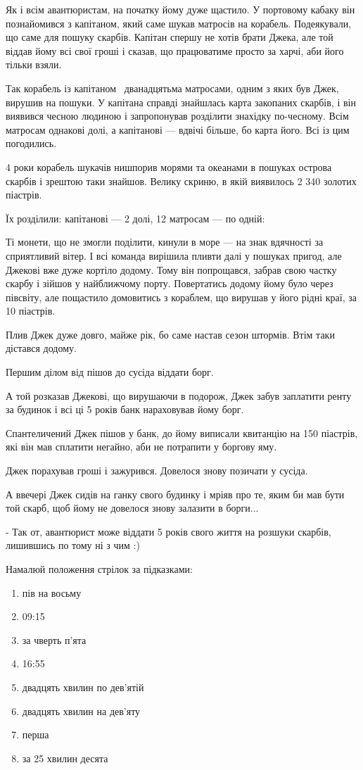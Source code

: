 Як і всім авантюристам, на початку йому дуже щастило.
У портовому кабаку він познайомився з капітаном, який саме шукав
матросів на корабель. Подеякували, що саме для пошуку скарбів.
Капітан спершу не хотів брати Джека, але той віддав йому всі свої
гроші і сказав, що працюватиме просто за харчі, аби його тільки взяли.

Так корабель із капітаном  дванадцятьма матросами, одним з яких був Джек,
вирушив на пошуки. У капітана справді знайшлась карта закопаних скарбів,
і він виявився чесною людиною і запропонував розділити знахідку по-чесному.
Всім матросам однакові долі, а капітанові --- вдвічі більше, бо карта його.
Всі із цим погодились.

4 роки корабель шукачів нишпорив морями та океанами в пошуках острова
скарбів і зрештою таки знайшов. Велику скриню, в якій виявилось
2 340 золотих піастрів.

Їх розділили: капітанові --- 2 долі, 12 матросам --- по одній:

Ті монети, що не змогли поділити, кинули в море --- на знак вдячності
за сприятливий вітер. І всі команда вирішила пливти далі у пошуках пригод,
але Джекові вже дуже кортіло додому. Тому він попрощався, забрав свою
частку скарбу і зійшов у найближчому порту. Повертатись додому йому було
через півсвіту, але пощастило домовитись з кораблем, що вирушав у його
рідні краї, за 10 піастрів.

Плив Джек дуже довго, майже рік, бо саме настав сезон штормів.
Втім таки дістався додому.

Першим ділом від пішов до сусіда віддати борг.

А той розказав Джекові, що вирушаючи в подорож, Джек забув заплатити
ренту за будинок і всі ці 5 років банк нараховував йому борг.

Спантеличений Джек пішов у банк, до йому виписали квитанцію на 150 піастрів,
які він мав сплатити негайно, аби не потрапити у боргову яму.

Джек порахував гроші і зажурився. Довелося знову позичати у сусіда.

А ввечері Джек сидів на ганку свого будинку і мріяв про те,
яким би мав бути той скарб, щоб йому не довелося знову залазити в борги...

- Так от, авантюрист може віддати 5 років свого життя на розшуки скарбів,
лишившись по тому ні з чим :)


\problem
Намалюй положення стрілок за підказками:
\begin{enumerate}
    \item пів на восьму
    \item 09:15
    \item за чверть п’ята
    \item 16:55
    \item двадцять хвилин по дев’ятій
    \item двадцять хвилин на дев’яту
    \item перша
    \item за 25 хвилин десята
\end{enumerate}


